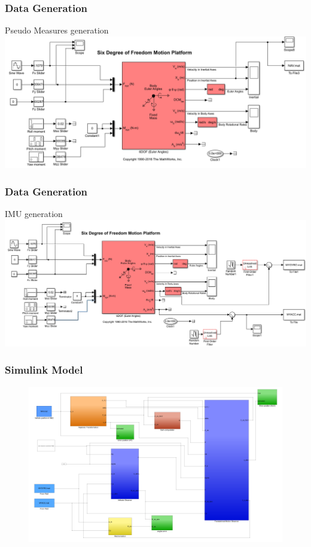 \documentclass{beamer}
\begin{document}
	\begin{frame}
			\frametitle{Data Generation}
			Pseudo Measures generation \\
			\vspace{0.3cm}
			\includegraphics[scale=0.24]{generator_of_pseudo_measures}
	\end{frame}
	
	\begin{frame}
		\frametitle{Data Generation}
		IMU generation \\
		\vspace{0.3cm}
		\includegraphics[scale=0.24]{generator_of_imu}
	\end{frame}
		
	\begin{frame}
		\frametitle{Simulink Model}
	
		\begin{figure}[H]
			\includegraphics[scale=0.3]{continuous_mod.png}
		\end{figure}
	\end{frame}
\end{document}
